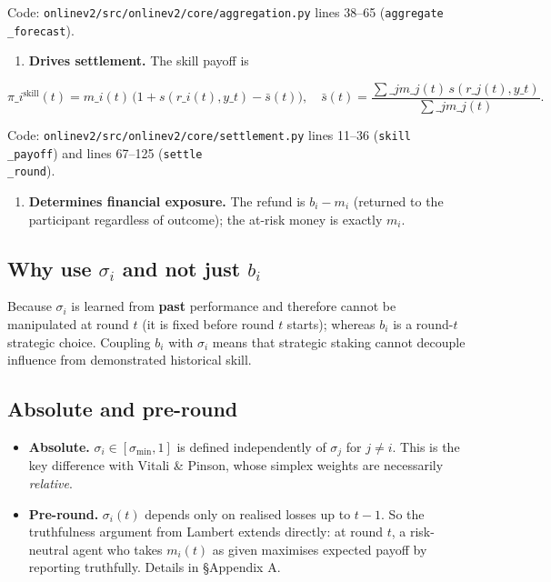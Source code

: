 \documentclass[11pt]{article}
\begin{document}
Code: \texttt{onlinev2/src/onlinev2/core/aggregation.py} lines 38--65 (\texttt{aggregate\\_forecast}).

\begin{enumerate}
\item \textbf{Drives settlement.} The skill payoff is
\end{enumerate}

$$
\pi\_i^{\text{skill}}(t) = m\_i(t)\,\bigl(1 + s(r\_i(t), y\_t) - \bar s(t)\bigr),\quad \bar s(t) = \frac{\sum\_j m\_j(t)\, s(r\_j(t), y\_t)}{\sum\_j m\_j(t)}.
$$

Code: \texttt{onlinev2/src/onlinev2/core/settlement.py} lines 11--36 (\texttt{skill\\_payoff}) and lines 67--125 (\texttt{settle\\_round}).

\begin{enumerate}
\item \textbf{Determines financial exposure.} The refund is $b_i - m_i$ (returned to the participant regardless of outcome); the at-risk money is exactly $m_i$.
\end{enumerate}

\subsection{Why use $\sigma_i$ and not just $b_i$}


Because $\sigma_i$ is learned from \textbf{past} performance and therefore cannot be manipulated at round $t$ (it is fixed before round $t$ starts); whereas $b_i$ is a round-$t$ strategic choice. Coupling $b_i$ with $\sigma_i$ means that strategic staking cannot decouple influence from demonstrated historical skill.

\subsection{Absolute and pre-round}


\begin{itemize}
\item \textbf{Absolute.} $\sigma_i \in [\sigma_{\min}, 1]$ is defined independently of $\sigma_j$ for $j \ne i$. This is the key difference with Vitali \& Pinson, whose simplex weights are necessarily \emph{relative}.
\item \textbf{Pre-round.} $\sigma_i(t)$ depends only on realised losses up to $t-1$. So the truthfulness argument from Lambert extends directly: at round $t$, a risk-neutral agent who takes $m_i(t)$ as given maximises expected payoff by reporting truthfully. Details in \S Appendix A.
\end{itemize}
\end{document}
